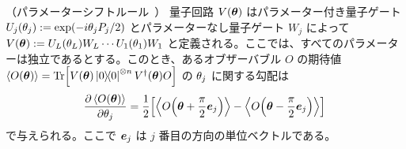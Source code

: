 \begin{screen}
    \begin{theorem}
        （パラメーターシフトルール~\cite{mitarai2018quantum,schuld2019evaluating}）
        量子回路 $V(\boldsymbol{\theta})$ はパラメーター付き量子ゲート $U_j(\theta_j) := \exp(-i\theta_j P_j/2)$ とパラメーターなし量子ゲート $W_j$ によって $V(\boldsymbol{\theta}) := U_L(\theta_L)W_L\cdots U_1(\theta_1)W_1$ と定義される。ここでは、すべてのパラメーターは独立であるとする。このとき、あるオブザーバブル $O$ の期待値 $\expval{O(\bs{\th})} = \Tr[V(\bs{\th})\dyad{0}\otn{n}V\dg(\bs{\th}) O]$ の $\theta_j$ に関する勾配は
        \begin{align}
            \pdv{\expval{O(\boldsymbol{\theta})}}{\theta_j}
            = \frac{1}{2}\qty[\expval{O\qty({\boldsymbol{\theta}}+\frac{\pi}{2}\boldsymbol{e}_j)}
            - \expval{O\qty({\boldsymbol{\theta}}-\frac{\pi}{2}\boldsymbol{e}_j)}]
        \end{align}
        で与えられる。ここで $\boldsymbol{e}_j$ は $j$ 番目の方向の単位ベクトルである。
    \end{theorem}
\end{screen}

